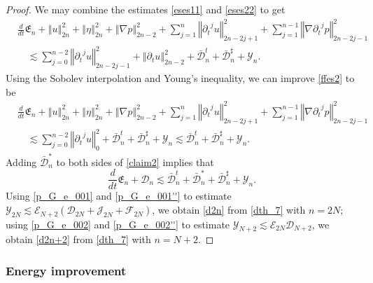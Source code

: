 \documentclass[a4paper,reqno,11pt]{amsart}
\numberwithin{equation}{section}
\providecommand{\norm}[1]{\left\Vert#1\right\Vert}
\providecommand{\sd}[1]{\mathcal{D}_{#1}}
\providecommand{\se}[1]{\mathcal{E}_{#1}}
\providecommand{\norm}[1]{\left\Vert#1\right\Vert}
\begin{document}
\begin{proof}
We may combine the estimates \eqref{eses11} and \eqref{eses22} to get
\begin{equation}\label{ffes2}
\begin{split}
&
\frac{d}{dt}\mathfrak{E}_n
+   \norm{    u  }_{2n}^2+\norm{    \eta  }_{2n}^2+\norm{\nabla p}_{2n-2}^2
+ \sum_{j=1}^{n}\norm{ {\partial_t}^j u  }_{2n-2j+1}^2+  \sum_{j=1}^{n-1}\norm{{\nabla} {\partial_t}^j  p  }_{2n-2j-1}^2
  \\&\quad{\lesssim}  \sum_{j=0}^{n-2}\norm{{\partial_t}^{j } u   }_{2n-2j-1 }^2 +\norm{{\partial}_t u}_{2n-2}^2  +\bar{\mathcal{D}}_n^t+\bar{\mathcal{D}}_n^\sharp +{\mathcal{Y}}_n.
  \end{split}
\end{equation}
Using the Sobolev interpolation and Young's inequality, we can improve \eqref{ffes2} to be
\begin{equation}\label{claim2}
\begin{split}
&
\frac{d}{dt}\mathfrak{E}_n
+   \norm{    u  }_{2n}^2+\norm{    \eta  }_{2n}^2+\norm{\nabla p}_{2n-2}^2
 + \sum_{j=1}^{n}\norm{ {\partial_t}^j u  }_{2n-2j+1}^2+  \sum_{j=1}^{n-1}\norm{{\nabla} {\partial_t}^j  p  }_{2n-2j-1}^2
 \\&\quad {\lesssim}  \sum_{j=0}^{n-2}\norm{{\partial_t}^{j } u   }_{0}^2  +\bar{\mathcal{D}}_n^t+\bar{\mathcal{D}}_n^\sharp  +{\mathcal{Y}}_n{\lesssim}  \bar{\mathcal{D}}_n^t+\bar{\mathcal{D}}_n^\sharp   +{\mathcal{Y}}_n.
  \end{split}
\end{equation}
Adding $\bar{\mathcal{D}}_n^\ast$ to both sides of \eqref{claim2} implies that
\begin{equation}\label{dth_7}
\frac{d}{dt}\mathfrak{E}_n
+  \mathcal{D}_n   {\lesssim}  \bar{\mathcal{D}}_n^t+\bar{\mathcal{D}}_n^\ast+\bar{\mathcal{D}}_n^\sharp  +{\mathcal{Y}}_n.
\end{equation}
Using \eqref{p_G_e_001} and \eqref{p_G_e_001''} to estimate
$\mathcal{Y}_{2N}\lesssim  { \se{N+2}  }(\sd{2N} +  \mathcal{J}_{2N} +{\mathcal{F}_{2N}})$, we obtain \eqref{d2n} from \eqref{dth_7} with $n=2N$; using \eqref{p_G_e_002} and \eqref{p_G_e_002''} to estimate $\mathcal{Y}_{N+2}\lesssim   {\mathcal{E}}_{2N}  {\mathcal{D}}_{N+2} $, we obtain \eqref{d2n+2} from \eqref{dth_7} with $n=N+2$.
\end{proof}

\subsubsection{Energy improvement}
\end{document}
